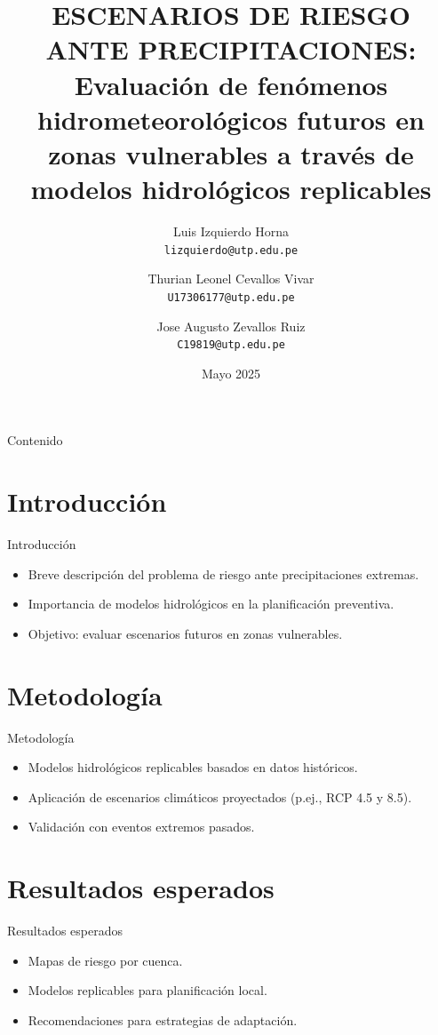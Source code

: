 \documentclass{beamer}
\title[Escenarios de riesgo ante precipitaciones]{ESCENARIOS DE RIESGO ANTE PRECIPITACIONES:\\Evaluación de fenómenos hidrometeorológicos futuros en zonas vulnerables a través de modelos hidrológicos replicables}
\author{
  Luis Izquierdo Horna \\ \texttt{lizquierdo@utp.edu.pe} \and
  Thurian Leonel Cevallos Vivar \\ \texttt{U17306177@utp.edu.pe} \and
  Jose Augusto Zevallos Ruiz \\ \texttt{C19819@utp.edu.pe}
}
\institute{Universidad Tecnológica del Perú (UTP)}
\date{Mayo 2025}
\begin{document}
\begin{frame}
  \titlepage
\end{frame}

\begin{frame}{Contenido}
  \tableofcontents
\end{frame}

\section{Introducción}
\begin{frame}{Introducción}
  \small
  \begin{itemize}
    \item Breve descripción del problema de riesgo ante precipitaciones extremas.
    \item Importancia de modelos hidrológicos en la planificación preventiva.
    \item Objetivo: evaluar escenarios futuros en zonas vulnerables.
  \end{itemize}
\end{frame}

\section{Metodología}
\begin{frame}{Metodología}
  \small
  \begin{itemize}
    \item Modelos hidrológicos replicables basados en datos históricos.
    \item Aplicación de escenarios climáticos proyectados (p.ej., RCP 4.5 y 8.5).
    \item Validación con eventos extremos pasados.
  \end{itemize}
\end{frame}

\section{Resultados esperados}
\begin{frame}{Resultados esperados}
  \small
  \begin{itemize}
    \item Mapas de riesgo por cuenca.
    \item Modelos replicables para planificación local.
    \item Recomendaciones para estrategias de adaptación.
  \end{itemize}
\end{frame}
\end{document}
